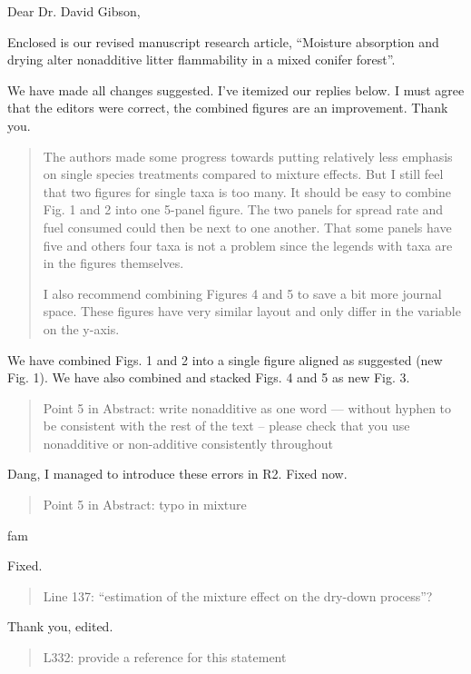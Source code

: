 \documentclass[letterpaper, 12pt]{letter}
\begin{document}
\begin{letter}{}

\opening{Dear Dr. David Gibson,}

Enclosed is our revised manuscript research article, ``Moisture absorption and
drying alter nonadditive litter flammability in a mixed conifer forest''.

We have made all changes suggested. I've itemized our replies below. I must agree that the editors were correct, the combined figures are an improvement. Thank you.

\begin{quote}
The authors made some progress towards putting relatively less emphasis on
single species treatments compared to mixture effects. But I still feel that
two figures for single taxa is too many. It should be easy to combine Fig. 1
and 2 into one 5-panel figure. The two panels for spread rate and fuel consumed
could then be next to one another. That some panels have five and others four
taxa is not a problem since the legends with taxa are in the figures
themselves.

I also recommend combining Figures 4 and 5 to save a bit more journal space.
These figures have very similar layout and only differ in the variable on the
y-axis.
\end{quote}

We have combined Figs. 1 and 2 into a single figure aligned as suggested (new Fig. 1). We have also combined and stacked Figs. 4 and 5 as new Fig. 3.

\begin{quote}
  Point 5 in Abstract: write nonadditive as one word --- without hyphen to be
  consistent with the rest of the text – please check that you use nonadditive or
  non-additive consistently throughout
\end{quote}

Dang, I managed to introduce these errors in R2. Fixed now.

\begin{quote}
Point 5 in Abstract: typo in mixture
\end{quote}fam


Fixed.

\begin{quote}
  Line 137: ``estimation of the mixture effect on the dry-down process''?
\end{quote}

Thank you, edited.

\begin{quote}
  L332: provide a reference for this statement
\end{quote}


\end{letter}
\end{document}
